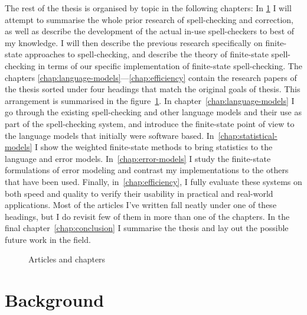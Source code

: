 \documentclass[officiallayout,draft]{unihelcompling}
\begin{document}
The rest of the thesis is organised by topic in the following chapters: In
\ref{chap:background} I will attempt to summarise the whole prior research of
spell-checking and correction, as well as describe the development of the
actual in-use spell-checkers to best of my knowledge. I will then describe the
previous research specifically on finite-state approaches to spell-checking,
and describe the theory of finite-state spell-checking in terms of our specific
implementation of finite-state spell-checking. The chapters
\ref{chap:language-models}---\ref{chap:efficiency} contain the research papers
of the thesis sorted under four headings that match the original goals of
thesis. This arrangement is summarised in the
figure~\ref{fig:articles-chapters}. In chapter~\ref{chap:language-models} I go
through the existing spell-checking and other language models and their use as
part of the spell-checking system, and introduce the finite-state point of view
to the language models that initially were software based.
In~\ref{chap:statistical-models} I show the weighted finite-state methods to
bring statistics to the language and error models. In~\ref{chap:error-models}
I study the finite-state formulations of error modeling and contrast my
implementations to the others that have been used. Finally, 
in~\ref{chap:efficiency}, I fully evaluate these systems on both speed and
quality to verify their usability in practical and real-world applications.
Most of the articles I've written fall neatly under one of these headings, but I do revisit few of them in more than one of the chapters. In the final 
chapter~\ref{chap:conclusion} I summarise the thesis and lay out the possible
future work in the field.

\begin{figure}
    \caption{Articles and chapters
    \label{fig:articles-chapters}}
\end{figure}

\chapter{Background}
\label{chap:background}
\end{document}

